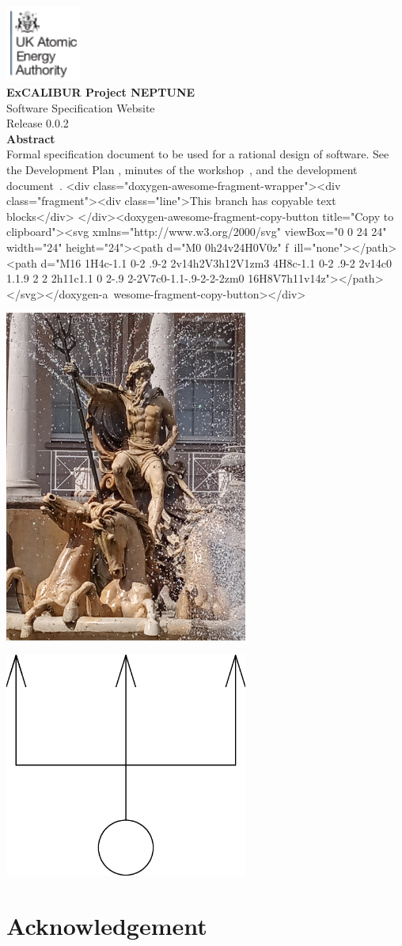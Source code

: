 \documentclass[11pt,twoside,a4paper]{report}
\newcommand{\copytext}[1]{\textrm{<div class="doxygen-awesome-fragment-wrapper"><div class="fragment"><div class="line">#1</div>
</div><doxygen-awesome-fragment-copy-button title="Copy to clipboard"><svg xmlns="http://www.w3.org/2000/svg" viewBox="0 0 24 24" width="24" height="24"><path d="M0 0h24v24H0V0z" f\
ill="none"></path><path d="M16 1H4c-1.1 0-2 .9-2 2v14h2V3h12V1zm3 4H8c-1.1 0-2 .9-2 2v14c0 1.1.9 2 2 2h11c1.1 0 2-.9 2-2V7c0-1.1-.9-2-2-2zm0 16H8V7h11v14z"></path></svg></doxygen-a\
wesome-fragment-copy-button></div>}}
\newcommand{\culhamtitle}{\LARGE Software Specification Website  \\[1.0\baselineskip] Release 0.0.2}%
\begin{document}
\vspace*{-30mm}
\includegraphics[width=2.5cm]{./corpics/cofaplus.png} \\[2.0\baselineskip]
{\LARGE {\textbf{\textsf{ExCALIBUR Project NEPTUNE}}}\\[2.0\baselineskip]}
{\LARGE \culhamtitle } \\[2.0\baselineskip]
{\textbf{\textsf{Abstract}}}\\
Formal specification document to be used for a rational design of software.
See the Development Plan \cite{y2d34} , minutes
of the workshop~\cite{y3re181}, and the development document~\cite{y3re314}.
\copytext{This branch has copyable text blocks}
\vfill
\centerline{\includegraphics[width=8cm]{./png/neptune.png}}
\centerline{\includegraphics[width=8cm]{./png/trident.png}}
\tableofcontents
%
\clearpage

\clearpage
\chapter*{Acknowledgement}\label{sec:ackn}


%
%
\printbibliography
\end{document}
